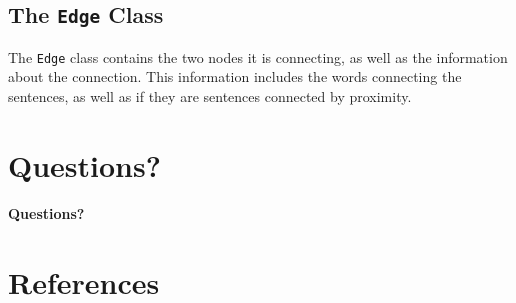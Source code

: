\documentclass[xcolor={usenames,dvipsnames,svgnames}]{beamer}
\begin{document}
\subsection{The {\tt Edge} Class}
\begin{frame}
The {\tt Edge} class contains the two nodes it is connecting, as well as the information about the connection.
\vskip 1pc
This information includes the words connecting the sentences, as well as if they are sentences connected by proximity.
\end{frame}

\nohead
\section{Questions?}
\begin{frame}

{\huge\bfseries Questions?}
\end{frame}

\section{References}
\begin{frame}[allowframebreaks]
\nocite{*}
\printbibliography
\end{frame}
\end{document}
